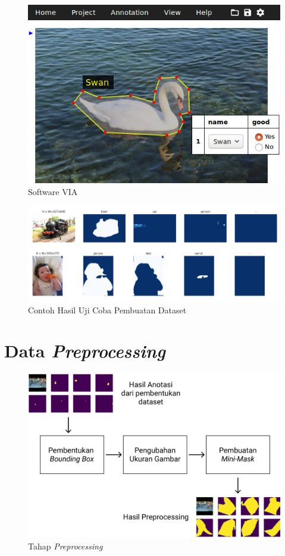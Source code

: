   \begin{figure}[h!]
	  \begin{center}
		\includegraphics[width= 0.7\linewidth]{bab3/Demo Via.jpg}
		\caption{Software VIA \cite{dutta2019vgg}}
		\label{fig: VIA}
	  \end{center}
  \end{figure}
  
  \begin{figure}[h!]
	\begin{center}
	  \includegraphics[width= 0.8\linewidth]{bab3/Contoh uji coba dataset.png}
	  \caption{Contoh Hasil Uji Coba Pembuatan Dataset \cite{matterport_maskrcnn_2017}}
	  \label{fig: Hasil Uji Coba}
	\end{center}
  \end{figure}
  
  
  \section{Data \textit{Preprocessing}}
  
  \begin{figure}[h!]
	  \begin{center}
		\includegraphics[width= 0.7\linewidth]{bab3/Preprocessing.png}
		\caption{Tahap \textit{Preprocessing}}
		\label{fig: Preprocessing}
	  \end{center}
  \end{figure}
  
